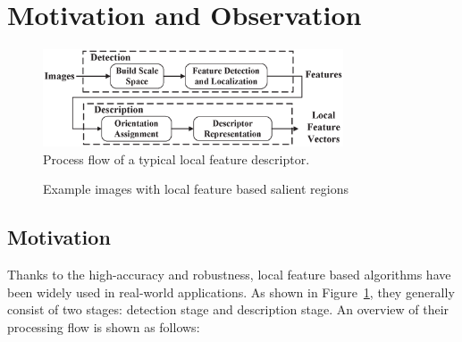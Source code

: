 \section{Motivation and Observation}
\label{sec:observation}

\begin{figure}
	\centering
	\includegraphics[width=3.5in]{images/fig-workflow.eps}
	\caption{Process flow of a typical local feature descriptor.}
	\label{fig:workflow}
\end{figure}

\begin{figure}[!t]
	\centering
	\hfil
	\caption{Example images with local feature based salient regions}
	\label{fig:observations}
\end{figure}

\subsection{Motivation}

Thanks to the high-accuracy and robustness, local feature based algorithms have been widely used in real-world applications. As shown in Figure~\ref{fig:workflow}, they generally consist of two stages: detection stage and description stage.  An overview of their processing flow is shown as follows:

